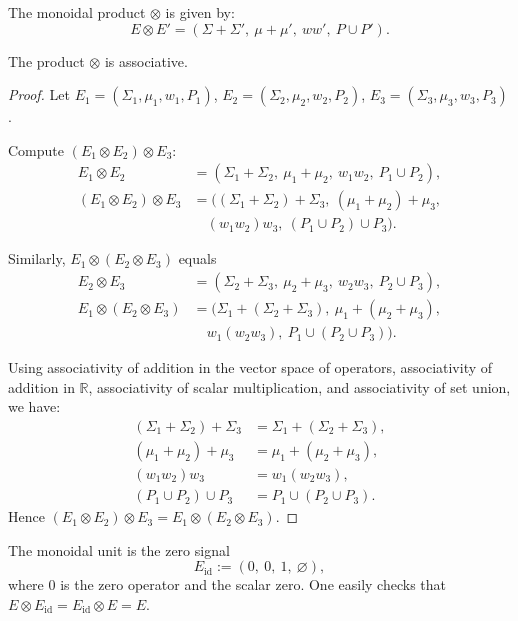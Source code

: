 \documentclass[11pt]{article}
\begin{document}
The monoidal product \(\otimes\) is given by:
\[
  E \otimes E' =
  (\Sigma + \Sigma',\ \mu + \mu',\ w w',\ P \cup P').
\]

\begin{proposition}
The product \(\otimes\) is associative.
\end{proposition}

\begin{proof}
Let \(E_1 = (\Sigma_1,\mu_1,w_1,P_1)\),
\(E_2 = (\Sigma_2,\mu_2,w_2,P_2)\),
\(E_3 = (\Sigma_3,\mu_3,w_3,P_3)\).

Compute \((E_1 \otimes E_2) \otimes E_3\):
\begin{align*}
  E_1 \otimes E_2
  &= (\Sigma_1 + \Sigma_2,\ \mu_1 + \mu_2,\ w_1 w_2,\ P_1 \cup P_2),\\
  (E_1 \otimes E_2) \otimes E_3
  &= ((\Sigma_1 + \Sigma_2) + \Sigma_3,\ (\mu_1 + \mu_2) + \mu_3,\\
  &\quad (w_1 w_2) w_3,\ (P_1 \cup P_2) \cup P_3).
\end{align*}

Similarly, \(E_1 \otimes (E_2 \otimes E_3)\) equals
\begin{align*}
  E_2 \otimes E_3
  &= (\Sigma_2 + \Sigma_3,\ \mu_2 + \mu_3,\ w_2 w_3,\ P_2 \cup P_3),\\
  E_1 \otimes (E_2 \otimes E_3)
  &= (\Sigma_1 + (\Sigma_2 + \Sigma_3),\ \mu_1 + (\mu_2 + \mu_3),\\
  &\quad w_1 (w_2 w_3),\ P_1 \cup (P_2 \cup P_3)).
\end{align*}

Using associativity of addition in the vector space of operators,
associativity of addition in \(\mathbb{R}\), associativity of scalar
multiplication, and associativity of set union, we have:
\begin{align*}
(\Sigma_1 + \Sigma_2) + \Sigma_3 &= \Sigma_1 + (\Sigma_2 + \Sigma_3),\\
(\mu_1 + \mu_2) + \mu_3 &= \mu_1 + (\mu_2 + \mu_3),\\
(w_1 w_2) w_3 &= w_1 (w_2 w_3),\\
(P_1 \cup P_2) \cup P_3 &= P_1 \cup (P_2 \cup P_3).
\end{align*}
Hence \((E_1 \otimes E_2) \otimes E_3 = E_1 \otimes (E_2 \otimes E_3)\).
\end{proof}

The monoidal unit is the zero signal
\[
  E_{\mathrm{id}} := (0,\ 0,\ 1,\ \varnothing),
\]
where \(0\) is the zero operator and the scalar zero. One easily checks that
\(E \otimes E_{\mathrm{id}} = E_{\mathrm{id}} \otimes E = E\).
\end{document}
